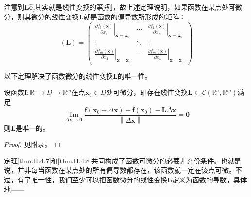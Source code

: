 \documentclass[main.tex]{subfiles}
\begin{document}
注意到$\mathbf{L\hat{e}}_j$其实就是线性变换的第$j$列，故上述定理说明，如果函数在某点处可微分，则其微分的线性变换$\mathbf{L}$就是函数的偏导数所形成的矩阵：
\[
    \left(\mathbf{L}\right)=\left(\begin{array}{ccc}
            \left.\frac{\partial f_1\left(\mathbf{x}\right)}{\partial x_1}\right|_{\mathbf{x}=\mathbf{x}_0} & \cdots & \left.\frac{\partial f_1\left(\mathbf{x}\right)}{\partial x_n}\right|_{\mathbf{x}=\mathbf{x}_0} \\
            \vdots                                                                                          & \ddots & \vdots                                                                                          \\
            \left.\frac{\partial f_m\left(\mathbf{x}\right)}{\partial x_1}\right|_{\mathbf{x}=\mathbf{x}_0} & \cdots & \left.\frac{\partial f_m\left(\mathbf{x}\right)}{\partial x_n}\right|_{\mathbf{x}=\mathbf{x}_0}
        \end{array}\right)
\]

以下定理解决了函数微分的线性变换$\mathbf{L}$的唯一性。

\begin{theorem}\label{thm:II.4.8}
    设函数$\mathbf{f}:\mathbb{R}^n\supset D\rightarrow\mathbb{R}^m$在点$\mathbf{x}_0\in D$处可微分，即存在线性变换$\mathbf{L}\in\mathcal{L}\left(\mathbb{R}^n,\mathbb{R}^m\right)$满足
    \[
        \lim_{\Delta\mathbf{x}\to\mathbf{0}}\frac{\mathbf{f}\left(\mathbf{x}_0+\Delta \mathbf{x}\right)-\mathbf{f}\left(\mathbf{x}_0\right)-\mathbf{L}\Delta\mathbf{x}}{\left\|\Delta\mathbf{x}\right\|}=\mathbf{0}
    \]
    则$\mathbf{L}$是唯一的。
\end{theorem}
\begin{proof}
    见附录。
\end{proof}

定理\ref{thm:II.4.7}和\ref{thm:II.4.8}共同构成了函数可微分的必要非充份条件。也就是说，并非每当函数在某点处的所有偏导数都存在，该函数就一定在该点可微\cite[“例2”,p.~21]{华工高数2009下}。不过，有了唯一性，我们至少可以把函数微分的线性变换$\mathbf{L}$定义为函数的导数，具体地——
\end{document}
